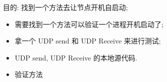 目的: 找到一个方法去让节点开机自启动; 
\begin{itemize}
    \item 需要找到一个方法可以验证一个进程开机启动了; 
    \item 拿一个 UDP send 和 UDP Receive 来进行测试; 
    \item UDP send, UDP Receive 的本地源代码. 
    \item 验证方法
\end{itemize}

